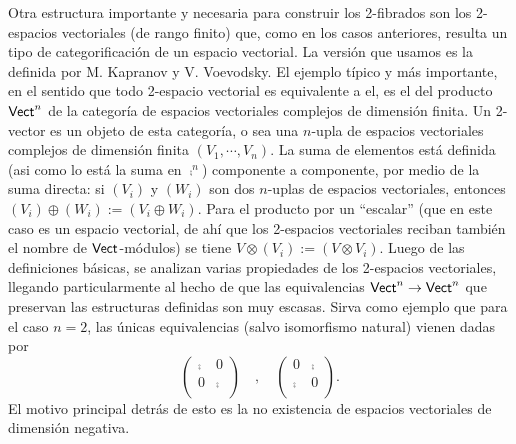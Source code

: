 {Otra estructura importante y necesaria para construir los 2-fibrados son los 2-espacios vectoriales (de rango finito) que, como en los casos anteriores, resulta un tipo de categorificaci\'on de un espacio vectorial. La versi\'on que usamos es la definida por M. Kapranov y V. Voevodsky. El ejemplo t\'ipico y m\'as importante, en el sentido que todo 2-espacio vectorial es equivalente a el, es el del producto $\mathsf{Vect}^n$ de la categor\'ia de espacios vectoriales complejos de dimensi\'on finita. Un 2-vector es un objeto de esta categor\'ia, o sea una $n$-upla de espacios vectoriales complejos de dimensi\'on finita $(V_1,\cdots ,V_n)$. La suma de elementos est\'a definida (asi como lo est\'a la suma en $\comp^n$) componente a componente, por medio de la suma directa: si $(V_i)$ y $(W_i)$ son dos $n$-uplas de espacios vectoriales, entonces $(V_i)\oplus (W_i):=(V_i\oplus W_i)$. Para el producto por un ``escalar'' (que en este caso es un espacio vectorial, de ah\'i que los 2-espacios vectoriales reciban tambi\'en el nombre de $\mathsf{Vect}$-m\'odulos) se tiene $V\otimes (V_i):=(V\otimes V_i)$. Luego de las definiciones b\'asicas, se analizan varias propiedades de los 2-espacios vectoriales, llegando particularmente al hecho de que las equivalencias $\mathsf{Vect}^n\to \mathsf{Vect}^n$ que preservan las estructuras definidas son muy escasas. Sirva como ejemplo que para el caso $n=2$, las \'unicas equivalencias (salvo isomorfismo natural) vienen dadas por
$$\begin{pmatrix}
\comp & 0 \\
0 & \comp \\
\end{pmatrix}\quad , \quad
\begin{pmatrix}
0 & \comp \\
\comp & 0 \\
\end{pmatrix}.$$
El motivo principal detr\'as de esto es la no existencia de espacios vectoriales de dimensi\'on negativa.

}
